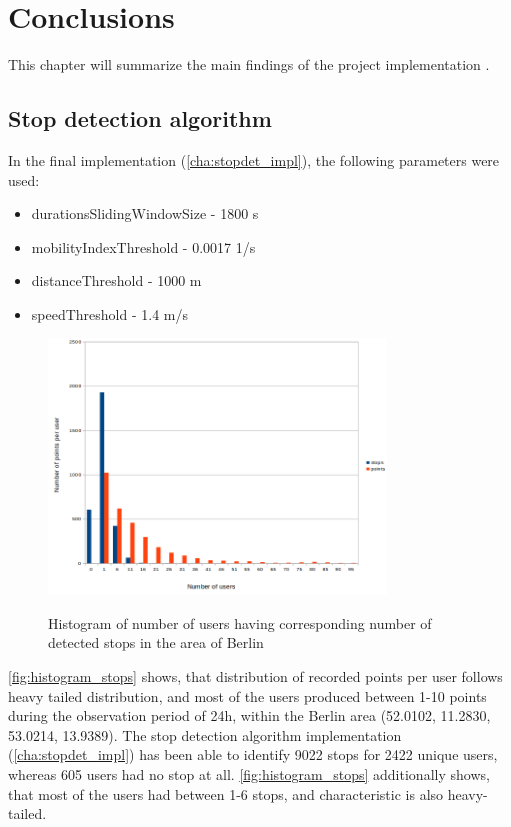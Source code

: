 \chapter{Conclusions}
\label{cha:conclusion}

This chapter will summarize the main findings of the project implementation \cite{macromovements}.

\section{Stop detection algorithm}

In the final implementation (\autoref{cha:stopdet_impl}), the following parameters were used:

\begin{itemize}  
\item durationsSlidingWindowSize - 1800 s
\item mobilityIndexThreshold - 0.0017 1/s
\item distanceThreshold - 1000 m
\item speedThreshold - 1.4 m/s
\end{itemize}

\begin{figure}[!ht]
	\centering
	\includegraphics[width=0.8\textwidth]{images/users_count.png}\\
	\caption{ Histogram of number of users having corresponding number of detected stops in the area of Berlin }
	\label{fig:histogram_stops}
\end{figure}

\FloatBarrier

\autoref{fig:histogram_stops} shows, that distribution of recorded points per user follows heavy tailed distribution, and most of the users produced between 1-10 points during the observation period of 24h, within the Berlin area (52.0102, 11.2830, 53.0214, 13.9389). The stop detection algorithm implementation (\autoref{cha:stopdet_impl}) has been able to identify 9022 stops for 2422 unique users, whereas 605 users had no stop at all. \autoref{fig:histogram_stops} additionally shows, that most of the users had between 1-6 stops, and characteristic is also heavy-tailed. 


